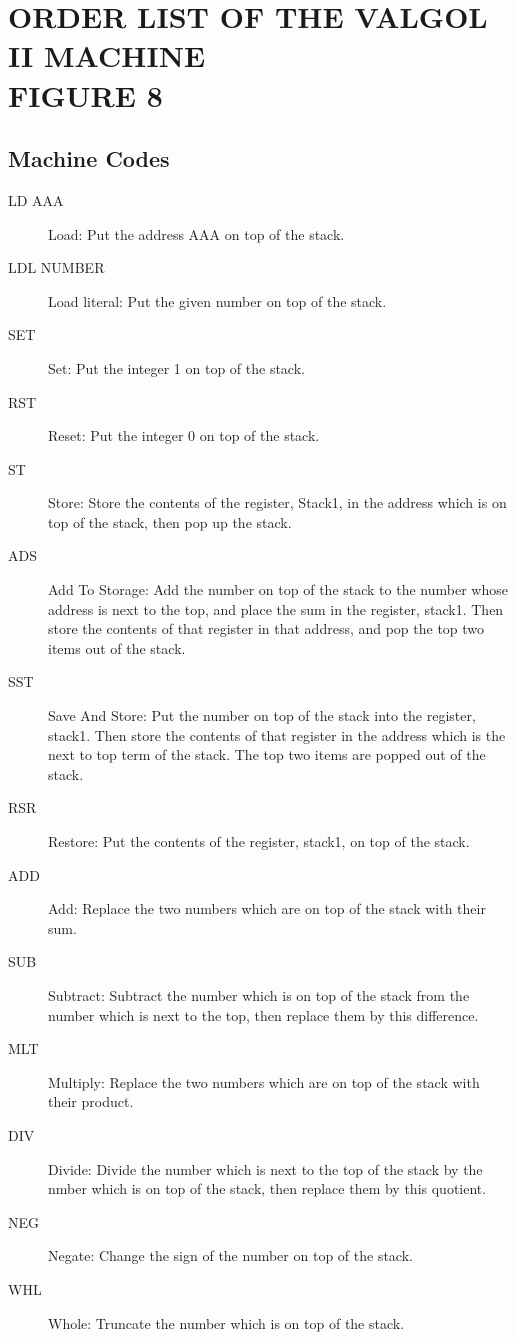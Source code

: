\documentclass[twocolumn]{article}
\begin{document}
\section{ORDER LIST OF THE VALGOL II MACHINE\\FIGURE 8}

\subsection{Machine Codes}
\begin{description}
\item[LD  AAA] Load: Put the address AAA on top of the stack.
\item[LDL NUMBER] Load literal: Put the given number on top of the stack.
\item[SET] Set: Put the integer 1 on top of the stack.
\item[RST] Reset: Put the integer 0 on top of the stack.
\item[ST] Store: Store the contents of the register, Stack1, in the address
which is on top of the stack, then pop up the stack.
\item[ADS] Add To Storage: Add the number on top of the stack to the number
whose address is next to the top, and place the sum in the register, stack1.
Then store the contents of that register in that address, and pop the top
two items out of the stack.
\item[SST] Save And Store: Put the number on top of the stack into the register,
stack1. Then store the contents of that register in the address which is the
next to top term of the stack.
The top two items are popped out of the stack.
\item[RSR] Restore: Put the contents of the register, stack1, on top of the stack.
\item[ADD] Add: Replace the two numbers which are on top of the stack with their sum.
\item[SUB] Subtract: Subtract the number which is on top of the stack from
the number which is next to the top, then replace them by this difference.
\item[MLT] Multiply: Replace the two numbers which are on top of the stack
with their product.
\item[DIV] Divide: Divide the number which is next to the top of the stack by the
nmber which is on top of the stack, then replace them by this quotient.
\item[NEG] Negate: Change the sign of the number on top of the stack.
\item[WHL] Whole: Truncate the number which is on top of the stack.

\end{description}
\end{document}
